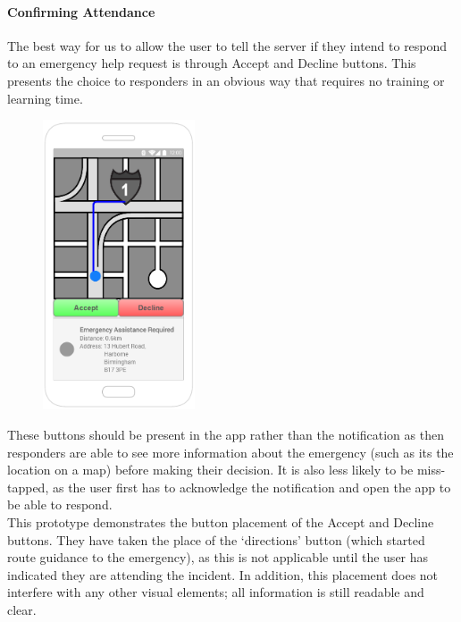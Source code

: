 \documentclass{article}
\begin{document}
	\paragraph{Confirming Attendance}
	The best way for us to allow the user to tell the server if they intend to respond to an emergency help request is through  Accept and Decline buttons. This presents the choice to responders in an obvious way that requires no training or learning time.\\
\begin{figure}
  \begin{center}
    \includegraphics[width=0.4\textwidth]{"Iteration2/Iteration 1 - Accept_Decline Buttons 1"}
  \end{center}
\end{figure}
These buttons should be present in the app rather than the notification as then responders are able to see more information about the emergency (such as its the location on a map) before making their decision. It is also less likely to be miss-tapped, as the user first has to acknowledge the notification and open the app to be able to respond.\\

This prototype demonstrates the button placement of the Accept and Decline buttons. They have taken the place of the ‘directions’ button (which started route guidance to the emergency), as this is not applicable until the user has indicated they are attending the incident. In addition, this placement does not interfere with any other visual elements; all information is still readable and clear.\\
\end{document}
